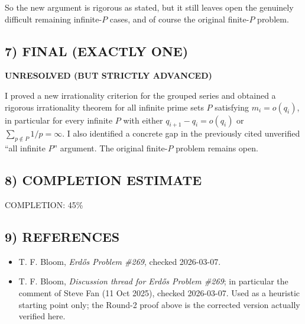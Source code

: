 So the new argument is rigorous as stated, but it still leaves open the genuinely difficult remaining infinite-$P$ cases, and of course the original finite-$P$ problem.

\subsection*{7) FINAL (EXACTLY ONE)}
\textbf{UNRESOLVED (BUT STRICTLY ADVANCED)}

I proved a new irrationality criterion for the grouped series and obtained a rigorous irrationality theorem for all infinite prime sets $P$ satisfying $m_i=o(q_i)$, in particular for every infinite $P$ with either $q_{i+1}-q_i=o(q_i)$ or $\sum_{p\notin P}1/p=\infty$. I also identified a concrete gap in the previously cited unverified ``all infinite $P$'' argument. The original finite-$P$ problem remains open.

\subsection*{8) COMPLETION ESTIMATE}
COMPLETION: 45\%

\subsection*{9) REFERENCES}
\begin{itemize}
\item T. F. Bloom, \emph{Erd\H{o}s Problem \#269}, checked 2026-03-07.
\item T. F. Bloom, \emph{Discussion thread for Erd\H{o}s Problem \#269}; in particular the comment of Steve Fan (11 Oct 2025), checked 2026-03-07. Used as a heuristic starting point only; the Round-2 proof above is the corrected version actually verified here.
\end{itemize}

